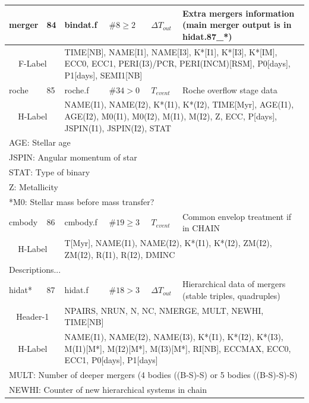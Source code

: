 \begin{longtable}{||p{0.42in}|p{0.25in}|p{0.6in}|p{0.6in}|p{0.4in}|p{2.3in}||}
  merger    & 84  & bindat.f   & $\#8\geq2$   & $\Delta T_{out}$    & Extra mergers information (main merger output is in hidat.87\_*) \\\hline
\multicolumn{2}{|c|}{ F-Label } & \multicolumn{4}{|p{4.4in}|}{ TIME[NB], NAME[I1], NAME[I3], K*[I1], K*[I3], K*[IM], ECC0, ECC1, PERI(I3)/PCR, PERI(INCM)[RSM], P0[days], P1[days], SEMI1[NB] }\\\hline\hline

 roche    & 85  & roche.f    & $\#34>0$   & $T_{event}$    & Roche overflow stage data    \\\hline
\multicolumn{2}{|c|}{ H-Label } & \multicolumn{4}{|p{4.4in}|}{ NAME(I1), NAME(I2), K*(I1), K*(I2), TIME[Myr], AGE(I1), AGE(I2), M0(I1), M0(I2), M(I1), M(I2), Z, ECC, P[days], JSPIN(I1), JSPIN(I2), STAT} \\\hline
\multicolumn{6}{|p{5.4in}|}{ AGE: Stellar age} \\
\multicolumn{6}{|p{5.4in}|}{ JSPIN: Angular momentum of star} \\
\multicolumn{6}{|p{5.4in}|}{ STAT: Type of binary} \\
\multicolumn{6}{|p{5.4in}|}{ Z: Metallicity} \\
\multicolumn{6}{|p{5.4in}|}{ *M0: Stellar mass before mass transfer? } \\\hline\hline

cmbody    & 86  & cmbody.f    & $\#19\geq 3$   & $T_{event}$    & Common envelop treatment if in CHAIN   \\\hline
\multicolumn{2}{|c|}{ H-Label } & \multicolumn{4}{|p{4.4in}|}{T[Myr], NAME(I1), NAME(I2), K*(I1),
K*(I2), ZM(I2), ZM(I2), R(I1), R(I2), DMINC} \\\hline
\multicolumn{6}{|p{5.4in}|}{Descriptions...} \\\hline\hline

 hidat*    & 87  & hidat.f    & $\#18>3$   & $\Delta T_{out}$      & Hierarchical data of mergers (stable triples, quadruples) \\\hline
\multicolumn{2}{|c|}{ Header-1} & \multicolumn{4}{|p{4.4in}|}{ NPAIRS, NRUN, N, NC, NMERGE, MULT, NEWHI, TIME[NB] } \\\hline
\multicolumn{2}{|c|}{ H-Label } & \multicolumn{4}{|p{4.4in}|}{ NAME(I1), NAME(I2), NAME(I3), K*(I1), K*(I2), K*(I3), M(I1)[M*], M(I2)[M*], M(I3)[M*], RI[NB], ECCMAX, ECC0, ECC1, P0[days], P1[days] } \\\hline
\multicolumn{6}{|p{5.4in}|}{ MULT: Number of deeper mergers (4 bodies ((B-S)-S) or 5 bodies ((B-S)-S)-S) } \\
\multicolumn{6}{|p{5.4in}|}{ NEWHI: Counter of new hierarchical systems in chain} \\
\hline\hline


\end{longtable}
